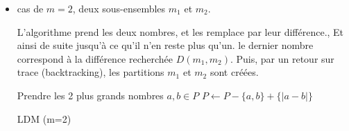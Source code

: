 \documentclass[a4paper,12pt]{report}
\theoremstyle{plain}				%
\theoremstyle{definition}				%
\begin{document}
\begin{itemize}
\item cas de $m=2$, deux sous-ensembles $m_1$ et $m_2$.

  L'algorithme prend les deux nombres, et les remplace par leur
  différence., Et ainsi de suite jusqu'à ce qu'il n'en reste plus
  qu'un.
  le dernier nombre correspond à la différence recherchée
  $D(m_1, m_2)$.
  Puis, par un retour sur trace (backtracking), les partitions $m_1$
  et $m_2$ sont créées.

\bigskip

\begin{algorithm}
\DontPrintSemicolon
{}


\BlankLine %
{
	Prendre les 2 plus grands nombres $a,b \in P$  \;
	$P \leftarrow P - \{a, b\} + \{ \lvert a-b \rvert \}$\;

} 

\caption{LDM (m=2)\label{algo:LDM2}}
\end{algorithm}


\bigskip


\end{itemize}
\end{document}
